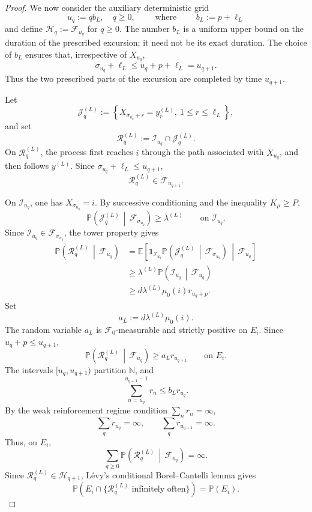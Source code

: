 \documentclass[10pt,letterpaper]{article}
\theoremstyle{compactplain}
\theoremstyle{compactdefinition}
\newcommand{\1}{\mathds{1}}
\begin{document}
\begin{proof}
We now consider the auxiliary deterministic grid
\[
u_q:=qb_L,
\quad q\geq0, \qquad \text{ where } \qquad b_L:=p+\ell_L
\]
and define \(\mathcal H_q:=\mathcal F_{u_q}\) for \(q\geq0\). The number \(b_L\) is a uniform upper bound on the duration of the prescribed
excursion; it need not be its exact duration.
The choice of \(b_L\) ensures that, irrespective of \(X_{u_q}\),
\[
\sigma_{u_q}+\ell_L
\leq
u_q+p+\ell_L
=
u_{q+1}.
\]
Thus the two prescribed parts of the excursion are completed by time
\(u_{q+1}\).



Let
\[
\mathcal J_q^{(L)}
:=
\left\{
X_{\sigma_{u_q}+r}=y_r^{(L)},
\ 1\leq r\leq\ell_L
\right\},
\]
and set
\[
\mathcal R_q^{(L)}
:=
\mathcal I_{u_q}\cap\mathcal J_q^{(L)}.
\]
On \(\mathcal R_q^{(L)}\), the process first reaches \(i\) through the path
associated with \(X_{u_q}\), and then follows \(y^{(L)}\). Since
\(\sigma_{u_q}+\ell_L\leq u_{q+1}\),
\[
\mathcal R_q^{(L)}\in\mathcal F_{u_{q+1}}.
\]



On \(\mathcal I_{u_q}\), one has \(X_{\sigma_{u_q}}=i\). By successive
conditioning and the inequality \(K_\mu\geq P\),
\[
\mathbb P\left(
\mathcal J_q^{(L)}
\,\middle|\,
\mathcal F_{\sigma_{u_q}}
\right)
\geq
\lambda^{(L)}
\qquad\text{on }\mathcal I_{u_q}.
\]
Since \(\mathcal I_{u_q}\in\mathcal F_{\sigma_{u_q}}\), the tower property
gives
\[
\begin{aligned}
\mathbb P\left(
\mathcal R_q^{(L)}
\,\middle|\,
\mathcal F_{u_q}
\right)
&=
\mathbb E\left[
\mathbf1_{\mathcal I_{u_q}}
\mathbb P\left(
\mathcal J_q^{(L)}
\,\middle|\,
\mathcal F_{\sigma_{u_q}}
\right)
\,\middle|\,
\mathcal F_{u_q}
\right]\\
&\geq
\lambda^{(L)}
\mathbb P\left(
\mathcal I_{u_q}
\,\middle|\,
\mathcal F_{u_q}
\right)\\
&\geq
d\lambda^{(L)}\mu_0(i)r_{u_q+p}.
\end{aligned}
\]
Set
\[
a_L:=d\lambda^{(L)}\mu_0(i).
\]
The random variable \(a_L\) is \(\mathcal F_0\)-measurable and strictly
positive on \(E_i\).
Since \(u_q+p\leq u_{q+1}\),
\[
\mathbb P\left(
\mathcal R_q^{(L)}
\,\middle|\,
\mathcal F_{u_q}
\right)
\geq
a_Lr_{u_{q+1}}
\qquad\text{on }E_i.
\]
The intervals \([u_q,u_{q+1})\) partition \(\mathbb N\), and
\[
\sum_{n=u_q}^{u_{q+1}-1}r_n
\leq
b_Lr_{u_q}.
\]
By the weak reinforcement regime condition \(\sum_n r_n=\infty\),
\[
\sum_qr_{u_q}=\infty,
\qquad
\sum_qr_{u_{q+1}}=\infty.
\]
Thus, on \(E_i\),
\[
\sum_{q\geq0}
\mathbb P\left(
\mathcal R_q^{(L)}
\,\middle|\,
\mathcal F_{u_q}
\right)
=
\infty.
\]
Since
\(\mathcal R_q^{(L)}\in\mathcal H_{q+1}\),
Lévy's conditional Borel--Cantelli lemma gives
\[
\mathbb P\left(
E_i\cap
\{\mathcal R_q^{(L)}\text{ infinitely often}\}
\right)
=
\mathbb P(E_i).
\]



\end{proof}
\end{document}
